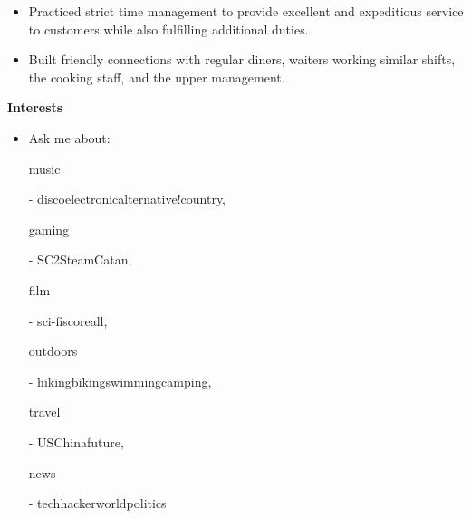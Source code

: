\documentclass[11pt]{article}
\begin{document}
\vspace{-0.8em}
\begin{itemize}
	\item Practiced strict time management to provide excellent and expeditious service to customers while also fulfilling additional duties.
	\vspace{-0.5em}
	\item Built friendly connections with regular diners, waiters working similar shifts, the cooking staff, and the upper management.
\end{itemize}

\vspace{-0.3em}

\begin{LARGE}
	\bf Interests
\end{LARGE}

\vspace{-0.5em}

\begin{itemize}
	\item Ask me about: \begin{bf}music\end{bf} - disco\textbar electronic\textbar alternative\textbar !country, \begin{bf}gaming\end{bf} - SC2\textbar Steam\textbar Catan, \begin{bf}film\end{bf} - sci-fi\textbar score\textbar all, \begin{bf}outdoors\end{bf} - hiking\textbar biking\textbar swimming\textbar camping, \begin{bf}travel\end{bf} - US\textbar China\textbar future, \begin{bf}news\end{bf} - tech\textbar hacker\textbar world\textbar politics
\end{itemize}
\end{document}
